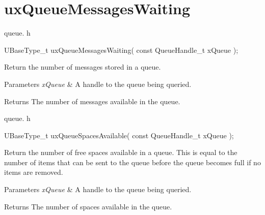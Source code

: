 \hypertarget{group__ux_queue_messages_waiting}{}\section{ux\+Queue\+Messages\+Waiting}
\label{group__ux_queue_messages_waiting}
queue. h 
\begin{DoxyPre}UBaseType\_t uxQueueMessagesWaiting( const QueueHandle\_t xQueue );\end{DoxyPre}


Return the number of messages stored in a queue.


\begin{DoxyParams}{Parameters}
{\em x\+Queue} & A handle to the queue being queried.\\
\hline
\end{DoxyParams}
\begin{DoxyReturn}{Returns}
The number of messages available in the queue.
\end{DoxyReturn}
queue. h 
\begin{DoxyPre}UBaseType\_t uxQueueSpacesAvailable( const QueueHandle\_t xQueue );\end{DoxyPre}


Return the number of free spaces available in a queue. This is equal to the number of items that can be sent to the queue before the queue becomes full if no items are removed.


\begin{DoxyParams}{Parameters}
{\em x\+Queue} & A handle to the queue being queried.\\
\hline
\end{DoxyParams}
\begin{DoxyReturn}{Returns}
The number of spaces available in the queue. 
\end{DoxyReturn}
